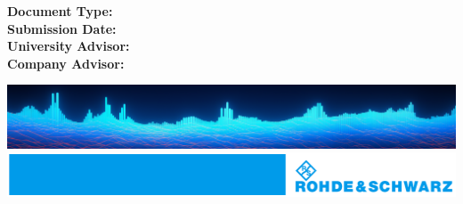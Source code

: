 \begin{titlepage}
    \vspace{0.2cm}

    \begin{flushleft}
        \small{
            \textbf{Document Type:} \documentType \\
            \textbf{Submission Date:} \submissionDate \\
            \vspace{0.2cm}  %
            \textbf{University Advisor:} \uniAdvisor \\
            \textbf{Company Advisor:} \compAdvisor \\
        }
    \end{flushleft}
    \vspace{2cm}
    \includegraphics[width=\textwidth]{figures/logos/A_digital_gradient_field.png}
    \vfill  %
    \includegraphics[width=\linewidth,keepaspectratio]{figures/logos/A_blue_strip_RS.pdf}

\end{titlepage}

\cleardoublepage  %
